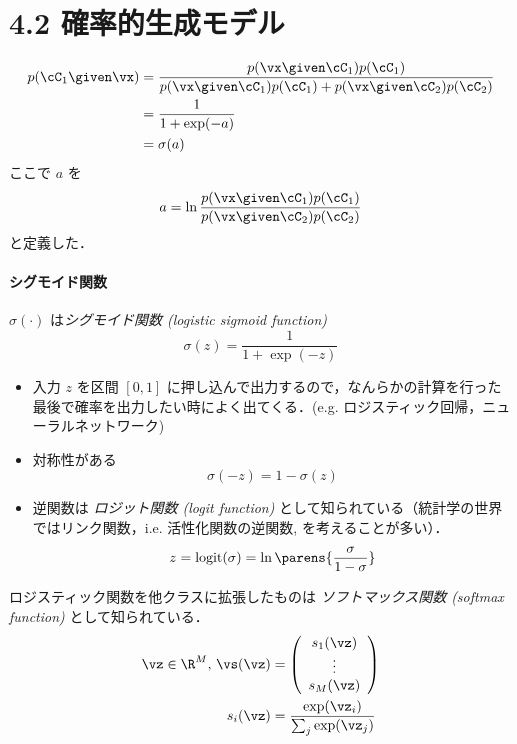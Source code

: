 
\setcounter{section}{4}
\setcounter{equation}{56}
\newcommand{\likpri}[1]{p(\vx\given\cC_{#1})p(\cC_{#1})}

\section*{4.2 確率的生成モデル}


\begin{align}
p(\cC_1\given\vx) & = \frac{\likpri{1}}{\likpri{1} + \likpri{2}} \notag \\
& = \frac{1}{1 + \exp(-a)} \notag \\
& = \sigma(a)
\end{align}
ここで $a$ を
\begin{equation}
  a = \ln \frac{\likpri{1}}{\likpri{2}}
\end{equation}
と定義した．

\paragraph{シグモイド関数}
$\sigma(\cdot)$ は\emph{シグモイド関数 (logistic sigmoid function)}
\begin{equation}
\sigma(z) = \frac{1}{1 + \exp(-z)}
\end{equation}

\begin{itemize}
  \item 入力 $z$ を区間 $[0, 1]$ に押し込んで出力するので，なんらかの計算を行った最後で確率を出力したい時によく出てくる．(e.g. ロジスティック回帰，ニューラルネットワーク)
  \item 対称性がある
  \begin{equation}
    \sigma(-z) = 1 - \sigma(z)
  \end{equation}
  \item 逆関数は \emph{ロジット関数 (logit function)} として知られている（統計学の世界ではリンク関数，i.e. 活性化関数の逆関数, を考えることが多い）．
  \begin{equation}
    z = \mathrm{logit}(\sigma) = \ln \parens{\frac{\sigma}{1-\sigma}}
  \end{equation}
\end{itemize}

\newpage
ロジスティック関数を他クラスに拡張したものは \emph{ソフトマックス関数 (softmax function)} として知られている．
\begin{align*}
  \vz \in \R^M,\, \vs(\vz) & = \left(\begin{array}{c}
    s_1(\vz) \\
    \vdots \\
    s_{M}(\vz)
    \end{array}\right) \\
  s_i(\vz) & = \frac{\exp(\vz_i)}{\sum_j \exp(\vz_j)}
\end{align*}

